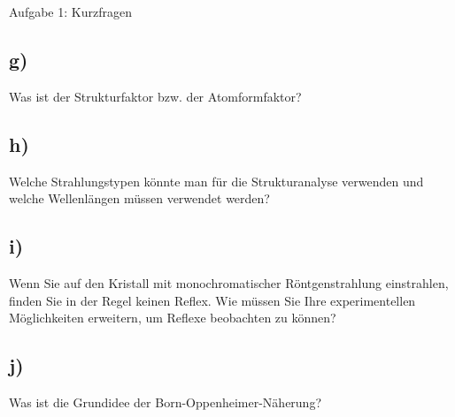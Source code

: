 \begin{aufgabe}{Aufgabe 1: Kurzfragen}
    \subsection{g)}
    Was ist der Strukturfaktor bzw. der Atomformfaktor?

    \subsection{h)}
    Welche Strahlungstypen könnte man für die Strukturanalyse verwenden und welche Wellenlängen müssen verwendet werden?

    \subsection{i)}
    Wenn Sie auf den Kristall mit monochromatischer Röntgenstrahlung einstrahlen,
    finden Sie in der Regel keinen Reflex.
    Wie müssen Sie Ihre experimentellen Möglichkeiten erweitern,
    um Reflexe beobachten zu können?

    \subsection{j)}
    Was ist die Grundidee der Born-Oppenheimer-Näherung?
\end{aufgabe}

